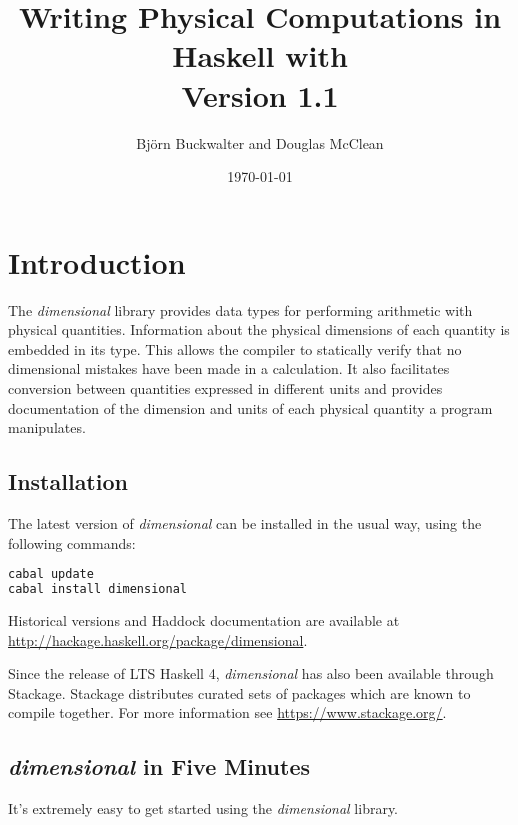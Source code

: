 \documentclass[11pt]{report}
\title{
	{Writing Physical Computations in Haskell with \thispackage}\\
	{\small{Version 1.1}}
}
\author{Björn Buckwalter and Douglas McClean}
\date{\today}
\newcommand{\packagename}[1]{\textit{#1}}
\newcommand{\thispackage}{\packagename{dimensional}}
\begin{document}
\maketitle

\tableofcontents

\chapter{Introduction}

The \thispackage{} library provides data types for performing arithmetic with physical
quantities. Information about the physical dimensions of each quantity is embedded in
its type. This allows the compiler to statically verify that no dimensional mistakes have
been made in a calculation. It also facilitates conversion between quantities expressed
in different units and provides documentation of the dimension and units of each physical
quantity a program manipulates.

\section{Installation}

The latest version of \thispackage{} can be installed in the usual way, using the following commands:

\begin{lstlisting}[language=bash]
cabal update
cabal install dimensional
\end{lstlisting}

Historical versions and Haddock documentation are available at \url{http://hackage.haskell.org/package/dimensional}.

Since the release of LTS Haskell 4, \thispackage{} has also been available through Stackage. Stackage
distributes curated sets of packages which are known to compile together. For more information see \url{https://www.stackage.org/}.

\section{\thispackage{} in Five Minutes}

It's extremely easy to get started using the \thispackage{} library.
\end{document}
